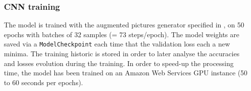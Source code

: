 %
%
%
%
%
%

\subsubsection{CNN training}

The model is trained with the augmented pictures generator specified in ,  on 50 epochs with batches of 32 samples (= 73 steps/epoch). The model weights are saved via a \texttt{ModelCheckpoint} each time that the validation loss each a new minima. The training historic is stored in order to later analyse the accuracies and losses evolution during the training. In order to speed-up the processing time, the model has been trained on an Amazon Web Services GPU instance (50 to 60 seconds per epochs).

%	
%
%
%
%
%	

